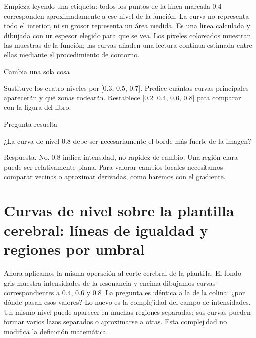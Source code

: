
Empieza leyendo una etiqueta: todos los puntos de la línea marcada 0.4 corresponden aproximadamente a ese nivel de la función. La curva no representa todo el interior, ni su grosor representa un área medida. Es una línea calculada y dibujada con un espesor elegido para que se vea. Los píxeles coloreados muestran las muestras de la función; las curvas añaden una lectura continua estimada entre ellas mediante el procedimiento de contorno.



\begin{Practica}{Cambia una sola cosa}

Sustituye los cuatro niveles por [0.3, 0.5, 0.7]. Predice cuántas curvas principales aparecerán y qué zonas rodearán. Restablece [0.2, 0.4, 0.6, 0.8] para comparar con la figura del libro.


\end{Practica}


\begin{Idea}{Pregunta resuelta}

¿La curva de nivel 0.8 debe ser necesariamente el borde más fuerte de la imagen?


Respuesta. No. 0.8 indica intensidad, no rapidez de cambio. Una región clara puede ser relativamente plana. Para valorar cambios locales necesitamos comparar vecinos o aproximar derivadas, como haremos con el gradiente.


\end{Idea}

\clearpage

\section{Curvas de nivel sobre la plantilla cerebral: líneas de igualdad y regiones por umbral}


Ahora aplicamos la misma operación al corte cerebral de la plantilla. El fondo gris muestra intensidades de la resonancia y encima dibujamos curvas correspondientes a 0.4, 0.6 y 0.8. La pregunta es idéntica a la de la colina: ¿por dónde pasan esos valores? Lo nuevo es la complejidad del campo de intensidades. Un mismo nivel puede aparecer en muchas regiones separadas; sus curvas pueden formar varios lazos separados o aproximarse a otras. Esta complejidad no modifica la definición matemática.


